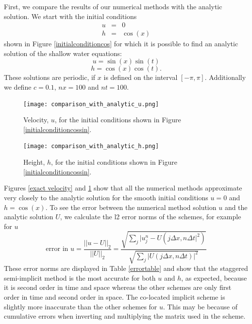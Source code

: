 \documentclass[a4paper, 10.8pt, notitlepage]{article}
\begin{document}
First, we compare the results of our numerical methods with the analytic solution. We start with the initial conditions 
\begin{eqnarray}
u  & =  & 0 \\
h & = &  \cos(x)
\end{eqnarray}
shown in Figure \ref{initialconditioncos} for which it is possible to find an analytic solution of the shallow water equations:
\begin{equation}\label{uanalytic}
u = \sin(x)\sin(t)
\end{equation}
\begin{equation}\label{hanalytic}
h = \cos(x)\cos(t).
\end{equation}
These solutions are periodic, if $x$ is defined on the interval $[-\pi, \pi]$. Additionally we define  $c = 0.1$, $nx = 100$ and $nt = 100$.


\renewcommand\theContinuedFloat{\alph{ContinuedFloat}}
\begin{figure} [H]
	\begin{minipage}{.5\textwidth}
		\ContinuedFloat*
		\captionsetup{width=0.9\textwidth}
		\captionsetup{justification=centering}
		\texttt{[image: comparison\_with\_analytic\_u.png]}
		\caption{\label{exact velocity} Velocity, $u$, for the initial conditions shown in Figure \ref{initialconditioncossin}. } 
	\end{minipage}
	\begin{minipage}{.5\textwidth}
		\ContinuedFloat
		\captionsetup{width=0.9\textwidth}
		\captionsetup{justification=centering}
		\texttt{[image: comparison\_with\_analytic\_h.png]}
		\caption{\label{exact height} Height, $h$, for the initial conditions shown in Figure \ref{initialconditioncossin}.} 
	\end{minipage}
\end{figure}

Figures \ref{exact velocity} and \ref{exact height} show that all the numerical methods approximate very closely to the analytic solution for the smooth initial conditions $u= 0$ and $h= \cos(x)$. To see the error between the numerical method solution $u$ and the analytic solution $U$, we calculate the l2 error norms of the schemes, for example for $u$
\begin{equation}
\text{error in } u = \frac{\lvert \lvert u - U\rvert\rvert_{2}}{\lvert \lvert U\rvert\rvert _{2}} = \frac{\sqrt{\sum_{j} \lvert u_{j}^{n} - U(j\Delta x, n\Delta t\rvert^{2})}}{\sqrt{\sum_{j} \lvert U(j\Delta x, n\Delta t)\rvert^{2}}}
\end{equation}
These error norms are displayed in Table \ref{errortable} and show that the staggered semi-implicit method is the most accurate for both $u$ and $h$, as expected, because it is second order in time and space whereas the other schemes are only first order in time and second order in space. The co-located implicit scheme is slightly more inaccurate than the other schemes for $u$. This may be because of cumulative errors when inverting and multiplying the matrix used in the scheme.
\end{document}
